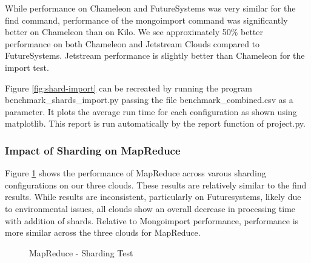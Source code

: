 \documentclass[sigconf]{acmart}
\begin{document}
While performance on Chameleon and FutureSystems was very similar for the find command, performance of the mongoimport command was significantly better on Chameleon than on Kilo.  We see approximately 50\% better performance on both Chameleon and Jetstream Clouds compared to FutureSystems. Jetstream performance is slightly better than Chameleon for the import test.

Figure \ref{fig:shard-import} can be recreated by running the program benchmark\_shards\_import.py passing the file benchmark\_combined.csv as a parameter.  It plots the average run time for each configuration as shown using matplotlib.    This report is run automatically by the report function of project.py.

\subsubsection{Impact of Sharding on MapReduce}



Figure \ref{fig:shard-mapreduce} shows the performance of MapReduce across varous sharding configurations on our three clouds.  These results are relatively similar to the find results.  While results are inconsistent, particularly on Futuresystems, likely due to environmental issues, all clouds show an overall decrease in processing time with addition of shards.  Relative to Mongoimport performance, performance is more similar across the three clouds for MapReduce.

\begin{figure}[htbp]
\centering
{}
\caption{MapReduce - Sharding Test}
\label{fig:shard-mapreduce}
\end{figure}
\end{document}
